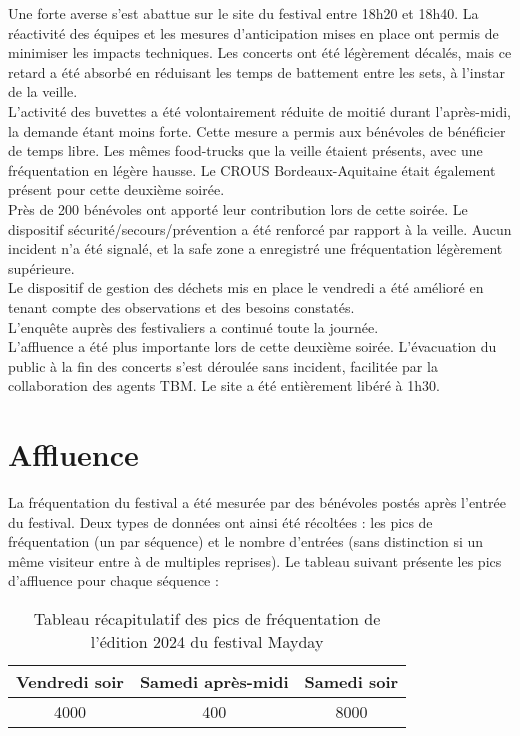 \documentclass[12pt,a4paper]{report}
\begin{document}
Une forte averse s'est abattue sur le site du festival entre 18h20 et 18h40. La réactivité des équipes et les mesures d'anticipation mises en place ont permis de minimiser les impacts techniques. Les concerts ont été légèrement décalés, mais ce retard a été absorbé en réduisant les temps de battement entre les sets, à l'instar de la veille.\\

L'activité des buvettes a été volontairement réduite de moitié durant l'après-midi, la demande étant moins forte. Cette mesure a permis aux bénévoles de bénéficier de temps libre. Les mêmes food-trucks que la veille étaient présents, avec une fréquentation en légère hausse. Le CROUS Bordeaux-Aquitaine était également présent pour cette deuxième soirée.\\

Près de 200 bénévoles ont apporté leur contribution lors de cette soirée. Le dispositif sécurité/secours/prévention a été renforcé par rapport à la veille. Aucun incident n'a été signalé, et la safe zone a enregistré une fréquentation légèrement supérieure.\\

Le dispositif de gestion des déchets mis en place le vendredi a été amélioré en tenant compte des observations et des besoins constatés.\\

L’enquête auprès des festivaliers a continué toute la journée.\\

L'affluence a été plus importante lors de cette deuxième soirée. L'évacuation du public à la fin des concerts s'est déroulée sans incident, facilitée par la collaboration des agents TBM. Le site a été entièrement libéré à 1h30.

\section{Affluence}
La fréquentation du festival a été mesurée par des bénévoles postés après l'entrée du festival. Deux types de données ont ainsi été récoltées : les pics de fréquentation (un par séquence) et le nombre d'entrées (sans distinction si un même visiteur entre à de multiples reprises). Le tableau suivant présente les pics d'affluence pour chaque séquence :
\begin{table}[h!]
\centering
\begin{tabular}{|c|c|c|}
\hline
Vendredi soir & Samedi après-midi & Samedi soir \\
\hline
4000 & 400 & 8000\\
\hline
\end{tabular}
\caption{Tableau récapitulatif des pics de fréquentation de l'édition 2024 du festival Mayday}
\end{table}
\end{document}
